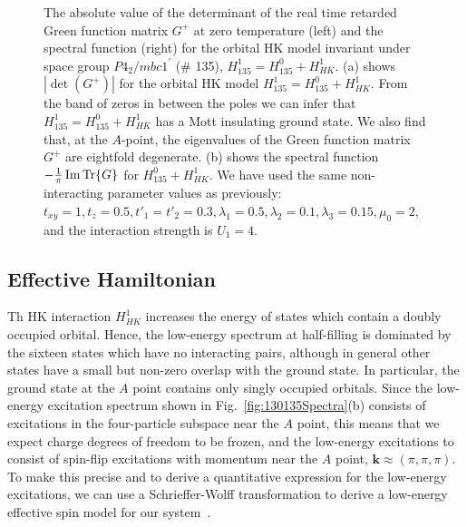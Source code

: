 \documentclass[prb,aps,amssymb,twocolumn,notitlepage]{revtex4-2}
\begin{document}
\begin{figure*}
\caption{The absolute value of the determinant of the real time retarded Green function matrix $G^{+}$ at zero temperature (left) and the spectral function (right) for the orbital HK model invariant under space group $P4_2/mbc1^\prime$ (\# 135), $H^{1}_{135}=H^{0}_{135}+H^{1}_{HK}$.
(a) shows $|\det(G^{+})|$ for the orbital HK model $H^{1}_{135}=H^{0}_{135}+H^{1}_{HK}$. 
From the band of zeros in between the poles we can infer that $H^{1}_{135}=H^{0}_{135}+H^{1}_{HK}$ has a Mott insulating ground state. 
We also find that, at the $A$-point, the eigenvalues of the Green function matrix $G^{+}$ are eightfold degenerate.
(b) shows the spectral function $-\frac{1}{\pi}\Im\Tr{G}$ for $H^{0}_{135}+H^{1}_{HK}$. 
We have used the same non-interacting parameter values as previously: 
$t_{xy}=1,t_z=0.5,t'_{1}=t'_2=0.3,\lambda_1=0.5,\lambda_2=0.1,\lambda_3=0.15, \mu_0=2$, and the interaction strength is $U_{1}=4$.
}
\label{fig:135GFs}
\end{figure*}




\subsection{Effective Hamiltonian}
\label{subsec:Schrieffer}
Th HK interaction $H^1_{HK}$ increases the energy of states which contain a doubly occupied orbital. 
Hence, the low-energy spectrum at half-filling is dominated by the sixteen states which have no interacting pairs, although in general other states have a small but non-zero overlap with the ground state. 
In particular, the ground state at the $A$ point contains only singly occupied orbitals.
Since the low-energy excitation spectrum shown in Fig.~\ref{fig:130135Spectra}(b) consists of excitations in the four-particle subspace near the $A$ point, this means that we expect charge degrees of freedom to be frozen, and the low-energy excitations to consist of spin-flip excitations with momentum near the $A$ point, $\mathbf{k}\approx (\pi,\pi,\pi)$. 
To make this precise and to derive a quantitative expression for the low-energy excitations, we can use a Schrieffer-Wolff transformation to derive a low-energy effective spin model for our system~\cite{bravyi2011schrieffer}. 
\end{document}
